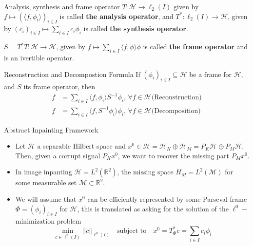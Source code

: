 \begin{frame}
\begin{block}{Analysis, synthesis and frame operator}
$T:\mathcal{H}\longrightarrow\ell_2(I)$ given by $f\mapsto (\langle f,\phi_i\rangle )_{i\in I}$ is called \textbf{the analysis operator}, and $T^*:\ell_2(I)\longrightarrow\mathcal{H}$, given by $(c_i)_{i\in I}\mapsto \sum_{i\in I}c_i\phi_i$ is called \textbf{the synthesis operator}.

$S=T^*T:\mathcal{H}\longrightarrow \mathcal{H}$, given by $f\mapsto \sum_{i\in I}\langle f,\phi\rangle \phi$ is called \textbf{the frame operator} and is an ivertible operator. 
\end{block}

\pause
\begin{block}{Reconstruction and Decompostion Formula}
If $(\phi_i)_{i\in I}\subseteq \mathcal{H}$ be a frame for $\mathcal{H}$, and $S$ its frame operator, then
$$
\begin{aligned}
f &=\sum_{i\in I}\langle f,\phi_i\rangle S^{-1}\phi_i \text{,  }\forall f\in\mathcal{H}\text{(Reconstruction)}\\
f &=\sum_{i\in I}\langle f,S^{-1}\phi_i\rangle\phi_i \text{,  }\forall f\in\mathcal{H}\text{(Decomposition)}
\end{aligned}
$$
\end{block}
\end{frame}

\begin{frame}{Abstract Inpainting Framework}
\begin{block}{}
\begin{itemize}
\item Let $\mathcal{H}$ a separable Hilbert space and $x^0\in\mathcal{H}=\mathcal{H}_K\oplus\mathcal{H}_M=P_K\mathcal{H}\oplus P_M\mathcal{H}$. Then, given a corrupt signal $P_K x^0$, we want to recover the missing part $P_Mx^0$.

\pause
\item In image inpanting $\mathcal{H}=L^2(\mathbb{R}^2)$, the missing space $H_M=L^2(\mathcal{M})$ for some measurable set $\mathcal{M}\subset \mathbb{R}^2$. 

\pause
\item We will assume that $x^0$ can be efficiently represented by some Parseval frame $\Phi=(\phi_i)_{i\in I}$ for $\mathcal{H}$, this is translated as asking for the solution of the $\ell^0-$minimization problem
$$
\underset{c\in\ell^2(I)}{\min}||c||_{\ell^0(I)}\quad\textrm{subject to}\quad x^0=T_{\Phi}^*c=\sum_{i\in I}c_i\phi_i
$$
\end{itemize}
\end{block}
\end{frame}

